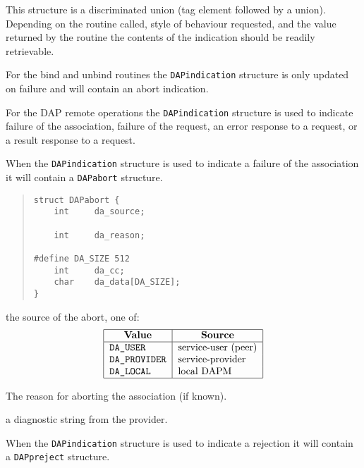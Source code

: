 This structure is a discriminated union (tag element followed by
a union).
Depending on the routine called, style of behaviour requested, and
the value returned by the routine the contents of the indication
should be readily retrievable.

For the bind and unbind routines the \verb"DAPindication" structure
is only updated on failure and will contain an abort indication.

For the DAP remote operations the \verb"DAPindication" structure is
used to indicate failure of the association, failure of the request,
an error response to a request, or a result response to a request.

When the \verb"DAPindication" structure is used to indicate a
failure of the association it will contain a \verb"DAPabort"
structure.

\label{DAPabort}
\begin{quote}\small\begin{verbatim}
struct DAPabort {
    int     da_source;

    int     da_reason;

#define DA_SIZE 512
    int     da_cc;
    char    da_data[DA_SIZE];
}
\end{verbatim}\end{quote}

\begin{describe}
\item [\verb"da\_source":]
the source of the abort, one of:
\[\begin{tabular}{|l|l|}
\hline
    \multicolumn{1}{|c|}{\bf Value}&
                \multicolumn{1}{c|}{\bf Source}\\
\hline
    \tt DA\_USER&              service-user (peer)\\
    \tt DA\_PROVIDER&          service-provider\\
    \tt DA\_LOCAL&             local DAPM\\
\hline
\end{tabular}\]


\item [\verb"da\_reason":]
The reason for aborting the association (if known). 

\item [\verb"da\_data"/\verb"da\_cc":] a diagnostic string from the
provider.
\end{describe}

When the \verb"DAPindication" structure is used to indicate a rejection
it will contain a \verb"DAPpreject" structure.

